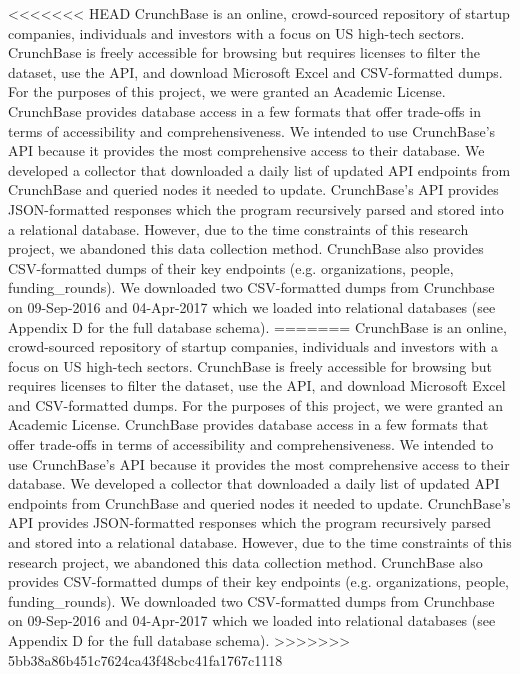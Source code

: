 \documentclass[../thesis/thesis.tex]{subfiles}
\begin{document}
<<<<<<< HEAD
CrunchBase is an online, crowd-sourced repository of startup companies, individuals and investors with a focus on US high-tech sectors. CrunchBase is freely accessible for browsing but requires licenses to filter the dataset, use the API, and download Microsoft Excel and CSV-formatted dumps. For the purposes of this project, we were granted an Academic License. CrunchBase provides database access in a few formats that offer trade-offs in terms of accessibility and comprehensiveness. We intended to use CrunchBase’s API because it provides the most comprehensive access to their database. We developed a collector that downloaded a daily list of updated API endpoints from CrunchBase and queried nodes it needed to update. CrunchBase’s API provides JSON-formatted responses which the program recursively parsed and stored into a relational database. However, due to the time constraints of this research project, we abandoned this data collection method. CrunchBase also provides CSV-formatted dumps of their key endpoints (e.g. organizations, people, funding\_rounds). We downloaded two CSV-formatted dumps from Crunchbase on 09-Sep-2016 and 04-Apr-2017 which we loaded into relational databases (see Appendix D for the full database schema).
=======
CrunchBase is an online, crowd-sourced repository of startup companies, individuals and investors with a focus on US high-tech sectors. CrunchBase is freely accessible for browsing but requires licenses to filter the dataset, use the API, and download Microsoft Excel and CSV-formatted dumps. For the purposes of this project, we were granted an Academic License. CrunchBase provides database access in a few formats that offer trade-offs in terms of accessibility and comprehensiveness. We intended to use CrunchBase’s API because it provides the most comprehensive access to their database. We developed a collector that downloaded a daily list of updated API endpoints from CrunchBase and queried nodes it needed to update. CrunchBase’s API provides JSON-formatted responses which the program recursively parsed and stored into a relational database. However, due to the time constraints of this research project, we abandoned this data collection method. CrunchBase also provides CSV-formatted dumps of their key endpoints (e.g. organizations, people, funding_rounds). We downloaded two CSV-formatted dumps from Crunchbase on 09-Sep-2016 and 04-Apr-2017 which we loaded into relational databases (see Appendix D for the full database schema).
>>>>>>> 5bb38a86b451c7624ca43f48cbc41fa1767c1118
\end{document}
